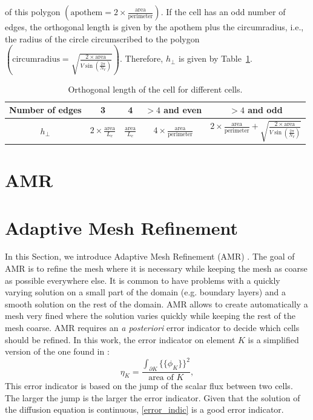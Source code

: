 \documentclass[preprint,10pt]{elsarticle}
\newcommand{\tbl}[1]{Table~\ref{#1}}                     %
\newcommand\ldb{\{\!\!\{}
\newcommand\rdb{\}\!\!\}}
\renewcommand{\(}{\left(}
\renewcommand{\)}{\right)}
\renewcommand{\[}{\left[}
\renewcommand{\]}{\right]}
\begin{document}
of this polygon $\(\textrm{apothem}=2\times
\frac{\textrm{area}}{\textrm{perimeter}}\)$. If the cell has an odd number of
edges, the orthogonal length is given by the apothem plus the circumradius,
i.e., the radius of the circle circumscribed to the polygon
$\(\textrm{circumradius}=\sqrt{\frac{2\times\textrm{area}}{V \sin
\(\frac{2\pi}{N_V}\)}}\)$. Therefore, $h_{\bot}$ is given by
\tbl{tab:ortho_length}.
\begin{table}[!htbp]
  \begin{centering}
    \begin{tabular}{|c|c|c|c|c|}
      \hline
      Number of edges & 3 & 4 & $> 4$ and even & $>4$ and odd \\
      \hline
      $h_{\bot}$ & $2\times \frac{\textrm{area}}{L_e}$ &
      $\frac{\textrm{area}}{L_e}$ & $4\times
      \frac{\textrm{area}}{\textrm{perimeter}}$ &
      $2\times \frac{\textrm{area}}{\textrm{perimeter}} +
      \sqrt{\frac{2\times\textrm{area}}{V \sin\(\frac{2\pi}{N_V}\)}}$\\
      \hline
    \end{tabular}
    \caption{Orthogonal length of the cell for different cells.}
  \end{centering}
  \label{tab:ortho_length}
\end{table}


\section{AMR} \label{sec:amr}
\section{Adaptive Mesh Refinement} \label{sec_amr}
In this Section, we introduce Adaptive Mesh Refinement (AMR)
\cite{Jessee1998,Wang2010a,Ragusa2010}. The goal of AMR is to refine the mesh
where it is necessary while keeping the mesh as coarse as possible everywhere
else. It is common to have problems with a quickly varying solution on a small
part of the domain (e.g. boundary layers) and a smooth solution on the rest of 
the domain. AMR allows to create automatically a mesh very fined where the
solution varies quickly while keeping the rest of the mesh coarse. AMR requires 
an \emph{a posteriori} error indicator to decide which cells should be refined. 
In this work, the error indicator on element $K$ is a simplified version of
the one found in \cite{Wang2010a}:
\begin{equation}
  \eta_K = \frac{\int_{\partial K} \ldb\phi_K\rdb^2}{\textrm{area of }K},
  \label{error_indic}
\end{equation}  
This error indicator is based on the jump of the scalar flux between
two cells. The larger the jump is the larger the error indicator. Given that
the solution of the diffusion equation is continuous, \cref{error_indic} is a
good error indicator. 
\end{document}
